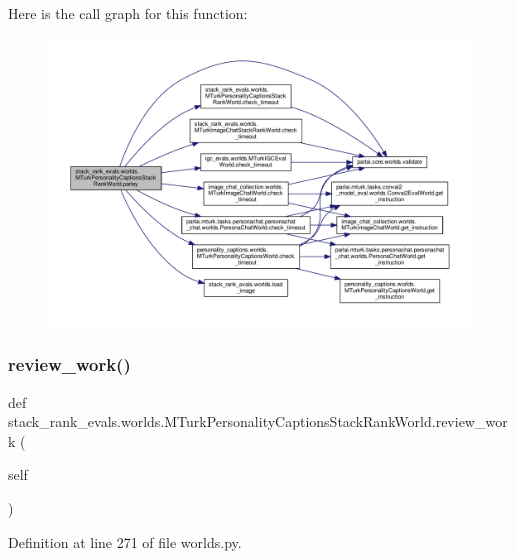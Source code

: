 Here is the call graph for this function\+:
\nopagebreak
\begin{figure}[H]
\begin{center}
\leavevmode
\includegraphics[width=350pt]{classstack__rank__evals_1_1worlds_1_1MTurkPersonalityCaptionsStackRankWorld_a41817ec1f909df958b73f3b5d810299e_cgraph}
\end{center}
\end{figure}
\mbox{\label{classstack__rank__evals_1_1worlds_1_1MTurkPersonalityCaptionsStackRankWorld_a2dd08f9107fee17e2833a529681d76db}} 
\subsubsection{\texorpdfstring{review\+\_\+work()}{review\_work()}}
{\footnotesize\ttfamily def stack\+\_\+rank\+\_\+evals.\+worlds.\+M\+Turk\+Personality\+Captions\+Stack\+Rank\+World.\+review\+\_\+work (\begin{DoxyParamCaption}\item[{}]{self }\end{DoxyParamCaption})}



Definition at line 271 of file worlds.\+py.



